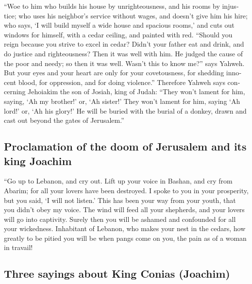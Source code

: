 \begin{paracol}{2}
\begin{otherlanguage}{english}
 ``Woe to him who builds his house by unrighteousness,
and his rooms by injustice; who uses his neighbor's service without
wages, and doesn't give him his hire;  who says, `I will
build myself a wide house and spacious rooms,' and cuts out windows for
himself, with a cedar ceiling, and painted with red. 
``Should you reign because you strive to excel in cedar? Didn't your
father eat and drink, and do justice and righteousness? Then it was well
with him.  He judged the cause of the poor and needy; so
then it was well. Wasn't this to know me?'' says Yahweh. 
But your eyes and your heart are only for your covetousness, for
shedding innocent blood, for oppression, and for doing violence.''
 Therefore Yahweh says concerning Jehoiakim the son of
Josiah, king of Judah: ``They won't lament for him, saying, `Ah my
brother!' or, `Ah sister!' They won't lament for him, saying `Ah lord!'
or, `Ah his glory!'  He will be buried with the burial of
a donkey, drawn and cast out beyond the gates of Jerusalem.''

\hypertarget{proclamation-of-the-doom-of-jerusalem-and-its-king-joachim}{%
\subsection{Proclamation of the doom of Jerusalem and its king
Joachim}\label{proclamation-of-the-doom-of-jerusalem-and-its-king-joachim}}

 ``Go up to Lebanon, and cry out. Lift up your voice in
Bashan, and cry from Abarim; for all your lovers have been destroyed.
 I spoke to you in your prosperity, but you said, `I will
not listen.' This has been your way from your youth, that you didn't
obey my voice.  The wind will feed all your shepherds,
and your lovers will go into captivity. Surely then you will be ashamed
and confounded for all your wickedness.  Inhabitant of
Lebanon, who makes your nest in the cedars, how greatly to be pitied you
will be when pangs come on you, the pain as of a woman in travail!

\hypertarget{three-sayings-about-king-conias-joachim}{%
\subsection{Three sayings about King Conias
(Joachim)}\label{three-sayings-about-king-conias-joachim}}


\end{otherlanguage}
\end{paracol}
